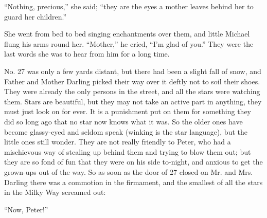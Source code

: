 ``Nothing, precious,'' she said; ``they are the eyes a mother leaves behind her
to guard her children.''

She went from bed to bed singing enchantments over them, and little Michael
flung his arms round her.
``Mother,'' he cried, ``I'm glad of you.''
They were the last words she was to hear from him for a long time.

No. 27 was only a few yards distant, but there had been a slight fall of snow,
and Father and Mother Darling picked their way over it deftly not to soil their
shoes.
They were already the only persons in the street, and all the stars were
watching them.
Stars are beautiful, but they may not take an active part in anything, they must
just look on for ever.
It is a punishment put on them for something they did so long ago that no star
now knows what it was.
So the older ones have become glassy-eyed and seldom speak (winking is the star
language), but the little ones still wonder.
They are not really friendly to Peter, who had a mischievous way of stealing up
behind them and trying to blow them out; but they are so fond of fun that they
were on his side to-night, and anxious to get the grown-ups out of the way.
So as soon as the door of 27 closed on Mr. and Mrs. Darling there was a
commotion in the firmament, and the smallest of all the stars in the Milky Way
screamed out:

``Now, Peter!''